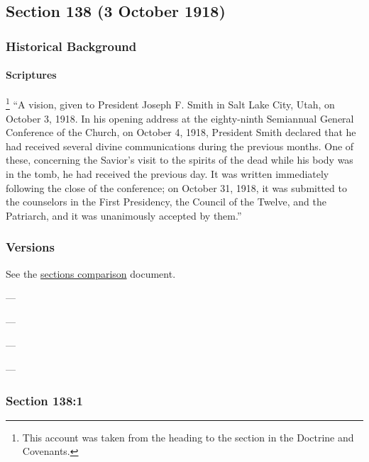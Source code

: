 \subsection{Section 138 (3 October 1918)}
	\label{DC138}
	
	\subsubsection{Historical Background}
		\label{DC138-HB}
		
		\paragraph{Scriptures}
		
			\footnote{%
				This account was taken from the heading to the section in the Doctrine and Covenants.
				}%
			``A vision, given to President Joseph F. Smith in Salt Lake City, Utah, on October 3, 1918. In his opening address at the eighty-ninth Semiannual General Conference of the Church, on October 4, 1918, President Smith declared that he had received several divine communications during the previous months. One of these, concerning the Savior's visit to the spirits of the dead while his body was in the tomb, he had received the previous day. It was written immediately following the close of the conference; on October 31, 1918, it was submitted to the counselors in the First Presidency, the Council of the Twelve, and the Patriarch, and it was unanimously accepted by them.''

	\subsubsection{Versions}
		\label{DC138-V}
		
		See the \href{https://drive.google.com/file/d/1goAvNz8jS4R8slYfMG_db55Ty2z_vmgK/view?usp=sharing}{sections comparison} document.
	
		\begin{compactdesc}
			\item[JSP] ---
			\item[BC] ---
			\item[DC 1835] ---
			\item[DC 1844] ---
		\end{compactdesc}

	\subsubsection{Section 138:1} %
		\label{DC138-1}

